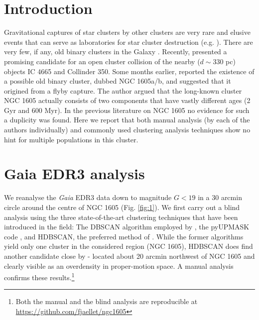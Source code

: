 \documentclass[RNAAS]{aastex631}
\begin{document}
\section{Introduction}
Gravitational captures of star clusters by other clusters are very rare and elusive events that can serve as laboratories for star cluster destruction (e.g. \citealt{Soubiran2018}). There are very few, if any, old binary clusters in the Galaxy \citep{Casado2022}. Recently, \citet{Piatti2022} presented a promising candidate for an open cluster collision of the nearby ($d\sim330$ pc) objects IC 4665 and Collinder 350.
Some months earlier, \citet{Camargo2021} reported the existence of a possible old binary cluster, dubbed NGC 1605a/b, and suggested that it origined from a flyby capture. The author argued that the long-known cluster NGC 1605 actually consists of two components that have vastly different ages (2 Gyr and 600 Myr). 
In the previous literature on NGC 1605 no evidence for such a duplicity was found. Here we report that both manual analysis (by each of the authors individually) and commonly used clustering analysis techniques show no hint for multiple populations in this cluster. 

\section{Gaia EDR3 analysis}
We reanalyse the {\it Gaia} EDR3 data \citep{Gaia2021} down to magnitude $G<19$ in a 30 arcmin circle around the centre of NGC 1605 (Fig. \ref{fig:1}). We first carry out a blind analysis using the three state-of-the-art clustering techniques that have been introduced in the field: The DBSCAN algorithm employed by \citet{Castro2022}, the pyUPMASK code \citep{Pera2021}, and HDBSCAN, the preferred method of \citet{Hunt2021}. 
While the former algorithms yield only one cluster in the considered region (NGC 1605), HDBSCAN does find another candidate close by - located about 20 arcmin northwest of NGC 1605 and clearly visible as an overdensity in proper-motion space. A manual analysis confirms these results.\footnote{Both the manual and the blind analysis are reproducible at \url{https://github.com/fjaellet/ngc1605}}
\end{document}
